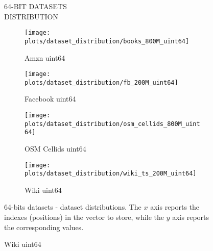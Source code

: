 \documentclass{article}
\begin{document}
\begin{figure}[!htbp]
\fbox
{
\begin{minipage}[t][0.98\textheight][t]{\textwidth}
\centering
    \vspace{20px}
    \begin{minipage}{0.95\linewidth}
    64-BIT DATASETS \\ DISTRIBUTION
    \end{minipage}
    \vspace{20px}

   \begin{minipage}{0.49\linewidth}
        \begin{figure}[H]
        \texttt{[image: plots/dataset\_distribution/books\_800M\_uint64]}
        \caption{Amzn uint64}
        \end{figure}
    \end{minipage}
    \begin{minipage}{0.49\linewidth}
        \begin{figure}[H]
            \texttt{[image: plots/dataset\_distribution/fb\_200M\_uint64]}
            \caption{Facebook uint64}
        \end{figure}
    \end{minipage}

    \vfill
    
    \begin{minipage}{0.49\linewidth}
        \begin{figure}[H]
        \texttt{[image: plots/dataset\_distribution/osm\_cellids\_800M\_uint64]}
        \caption{OSM Cellids uint64}
        \end{figure}
    \end{minipage}
    \begin{minipage}{0.49\linewidth}
        \begin{figure}[H]
            \texttt{[image: plots/dataset\_distribution/wiki\_ts\_200M\_uint64]}
            \caption{Wiki uint64}
        \end{figure}
    \end{minipage}

    \vfill
    \centering
    \begin{minipage}{\linewidth}
        64-bits datasets - dataset distributions. The $x$ axis reports the indexes (positions) in the vector to store, while the $y$ axis reports the corresponding values.
    \end{minipage}
    \vspace{10px}
\end{minipage}
}
\end{figure}
\end{document}
